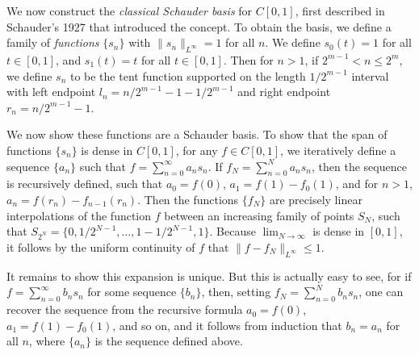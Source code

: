 \begin{example}
    We now construct the \emph{classical Schauder basis} for $C[0,1]$, first described in Schauder's 1927 that introduced the concept. To obtain the basis, we define a family of \emph{functions} $\{ s_n \}$ with $\| s_n \|_{L^\infty} = 1$ for all $n$. We define $s_0(t) = 1$ for all $t \in [0,1]$, and $s_1(t) = t$ for all $t \in [0,1]$. Then for $n > 1$, if $2^{m-1} < n \leq 2^m$, we define $s_n$ to be the tent function supported on the length $1/2^{m-1}$ interval with left endpoint $l_n = n/2^{m-1} - 1 - 1/2^{m-1}$ and right endpoint $r_n = n/2^{m-1} - 1$.

    We now show these functions are a Schauder basis. To show that the span of functions $\{ s_n \}$ is dense in $C[0,1]$, for any $f \in C[0,1]$, we iteratively define a sequence $\{ a_n \}$ such that $f = \sum_{n = 0}^\infty a_n s_n$. If $f_N = \sum_{n = 0}^N a_n s_n$, then the sequence is recursively defined, such that $a_0 = f(0)$, $a_1 = f(1) - f_0(1)$, and for $n > 1$, $a_n = f(r_n) - f_{n-1}(r_n)$. Then the functions $\{ f_N \}$ are precisely linear interpolations of the function $f$ between an increasing family of points $S_N$, such that $S_{2^N} = \{ 0, 1/2^{N-1}, \dots, 1 - 1/2^{N-1}, 1 \}$. Because $\lim_{N \to \infty}$ is dense in $[0,1]$, it follows by the uniform continuity of $f$ that $\| f - f_N \|_{L^\infty} \leq 1$.

    It remains to show this expansion is unique. But this is actually easy to see, for if $f = \sum_{n = 0}^\infty b_n s_n$ for some sequence $\{ b_n \}$, then, setting $f_N = \sum_{n = 0}^N b_n s_n$, one can recover the sequence from the recursive formula $a_0 = f(0)$, $a_1 = f(1) - f_0(1)$, and so on, and it follows from induction that $b_n = a_n$ for all $n$, where $\{ a_n \}$ is the sequence defined above.
\end{example}

